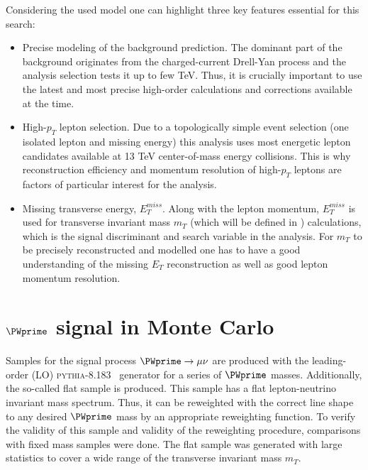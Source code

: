 Considering the used model one can highlight three key features essential for this search:
\begin{itemize}
 \item Precise modeling of the background prediction. 
 The dominant part of the background originates from the charged-current Drell-Yan process and the analysis selection tests it up to few TeV.
 Thus, it is crucially important to use the latest and most precise high-order calculations and corrections available at the time.
 \item High-$p_T$ lepton selection. Due to a topologically simple event selection (one isolated lepton and missing energy) 
 this analysis uses most energetic lepton candidates available at 13 TeV center-of-mass energy collisions.
 This is why reconstruction efficiency and momentum resolution of high-$p_T$ leptons are factors of particular interest for the analysis.
 \item Missing transverse energy, $E_T^{miss}$. Along with the lepton momentum, $E_T^{miss}$ is used for transverse invariant mass $m_T$ (which will be defined in ) calculations,
 which is the signal discriminant and search variable in the analysis. For $m_T$ to be precisely reconstructed and modelled one has to have a good understanding of the missing $E_T$ reconstruction as well as good lepton momentum resolution.
\end{itemize}

\section{$\PWprime$ signal in Monte Carlo}
\label{sec:wprimeSignal} 

% 

Samples for the signal process $\PWprime \to \mu \nu$ are produced with the leading-order (LO) 
{\scshape pythia-8.183}~\cite{pythia8} generator for a series of $\PWprime$ masses. 
Additionally, the so-called flat sample is produced. This sample has a flat lepton-neutrino invariant mass spectrum.
Thus, it can be reweighted with the correct line shape to any desired $\PWprime$ mass by an appropriate reweighting function.
To verify the validity of this sample and validity of the reweighting procedure, comparisons with fixed mass samples were done.
The flat sample was generated with large statistics to cover
a wide range of the transverse invariant mass $m_T$.

